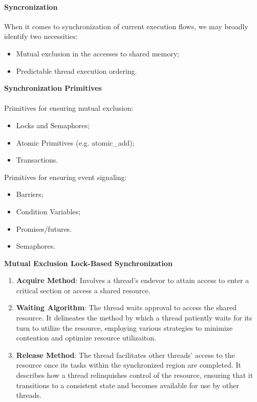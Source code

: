 \paragraph{Syncronization} When it comes to synchronization of current execution flows, we may broadly identify two necessities:
\begin{itemize}
    \item Mutual exclusion in the accesses to shared memory;
    \item Predictable thread execution ordering.
\end{itemize}
\par {\large \textbf{Synchronization Primitives}} \paragraph{}
\begin{minipage}[t]{0.45\textwidth}
    \par Primitives for ensuring mutual exclusion:
    \begin{itemize}
        \item Locks and Semaphores;
        \item Atomic Primitives (e.g. atomic\_add);
        \item Transactions.
    \end{itemize}
\end{minipage}
\hfill \vrule \hfill
\begin{minipage}[t]{0.45\textwidth}
    \par Primitives for ensuring event signaling:
    \begin{itemize}
        \item Barriers;
        \item Condition Variables;
        \item Promises/futures.
        \item Semaphores.
    \end{itemize}
\end{minipage}
\par
\par {\large \textbf{Mutual Exclusion Lock-Based Synchronization}}
\begin{enumerate}[label=\textbf{Step \arabic* -}]
    \item \textbf{Acquire Method}: Involves a thread's endevor to attain access to enter a critical section or access a shared resource.
    \item \textbf{Waiting Algorithm}: The thread waits approval to access the shared resource. It delineates the method by which a thread patiently waits for its turn to utilize the resource, employing various strategies to minimize contention and optimize resource utilizaiton.
    \item \textbf{Release Method}: The thread facilitates other threads' access to the resource once its tasks within the synchronized region are completed. It describes how a thread relinquishes control of the resource, ensuring that it transitions to a consistent state and becomes available for use by other threads.\paragraph{}
\end{enumerate}
